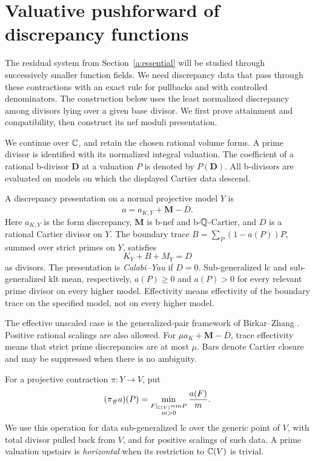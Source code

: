 \section{Valuative pushforward of discrepancy functions}
\label{b:discrepancy-push}

The residual system from Section~\ref{a:essential} will be studied through
successively smaller function fields. We need discrepancy data that pass
through these contractions with an exact rule for pullbacks and with
controlled denominators. The construction below uses the least normalized
discrepancy among divisors lying over a given base divisor. We first prove
attainment and compatibility, then construct its nef moduli presentation.

We continue over \(\mathbb C\), and retain the chosen rational volume forms.
A prime divisor is identified with its normalized integral valuation.
The coefficient of a rational b-divisor \(\mathbf D\) at a valuation
\(P\) is denoted by \(P(\mathbf D)\). All b-divisors are evaluated on
models on which the displayed Cartier data descend.

\begin{definition}\label{b:discrepancy-presentation}
A discrepancy presentation on a normal projective model \(Y\) is
\[
                 a=a_{K,Y}+\mathbf M-\overline D.
\]
Here \(a_{K,Y}\) is the form discrepancy, \(\mathbf M\) is b-nef and
b-\(\mathbb Q\)-Cartier, and \(D\) is a rational Cartier divisor on \(Y\).
The boundary trace \(B=\sum_P(1-a(P))P\), summed over strict primes
on \(Y\), satisfies
\[
                       K_Y+B+M_Y=D
\]
as divisors. The presentation is \emph{Calabi--Yau} if \(D=0\).
Sub-generalized lc and sub-generalized klt mean, respectively,
\(a(P)\ge0\) and \(a(P)>0\) for every relevant prime divisor on every
higher model. Effectivity means effectivity of the boundary trace
on the specified model, not on every higher model.
\end{definition}

The effective unscaled case is the generalized-pair framework of
Birkar--Zhang \cite[Definitions~1.4 and~4.1]{BirkarZhang}.
Positive rational scalings are also allowed. For
\(\mu a_K+\mathbf M-\overline D\), trace effectivity means that strict
prime discrepancies are at most \(\mu\). Bars denote Cartier closure
and may be suppressed when there is no ambiguity.

\begin{definition}\label{b:valuative-push}
For a projective contraction \(\pi:Y\to V\), put
\begin{equation}\label{eq:B1}
 (\pi_\#a)(P)=
       \min_{\substack{F|_{\mathbb C(V)}=mP\\m>0}}\frac{a(F)}m.
\end{equation}
We use this operation for data sub-generalized lc over the generic
point of \(V\), with total divisor pulled back from \(V\), and for
positive scalings of such data. A prime valuation upstairs is
\emph{horizontal} when its restriction to \(\mathbb C(V)\) is trivial.
\end{definition}


